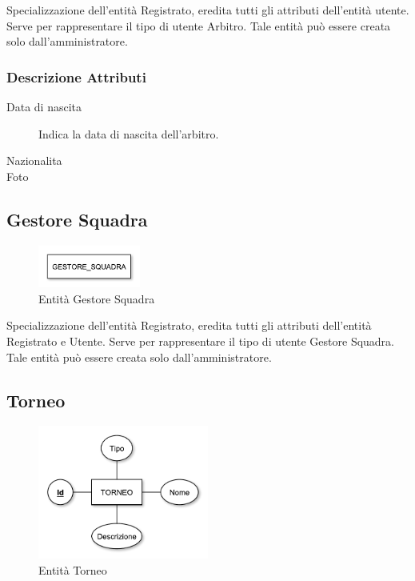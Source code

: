 		Specializzazione dell'entità Registrato, eredita tutti gli attributi dell'entità utente. Serve per rappresentare il tipo di utente Arbitro. Tale entità può essere creata solo dall'amministratore.
		
		\subsubsection*{Descrizione Attributi}
		
		\begin{description}
			
			\item[Data di nascita]
			Indica la data di nascita dell'arbitro.
			
			\item[Nazionalita]
			
			
			\item[Foto]
			
			
		\end{description}
	
	\subsection{Gestore Squadra}
	
		\begin{figure}[h]
			\centering
			\includegraphics[width=0.3\textwidth]
			{immagini/05-gestore-squadra}
			
			\caption{Entità Gestore Squadra}
		\end{figure}
		
		Specializzazione dell'entità Registrato, eredita tutti gli attributi dell'entità Registrato e Utente. Serve per rappresentare il tipo di utente Gestore Squadra. Tale entità può essere creata solo dall'amministratore.
	
	\subsection{Torneo}
	
		\begin{figure}[h]
			\centering
			\includegraphics[width=0.5\textwidth]
			{immagini/06-torneo}
			
			\caption{Entità Torneo}
		\end{figure}
		
